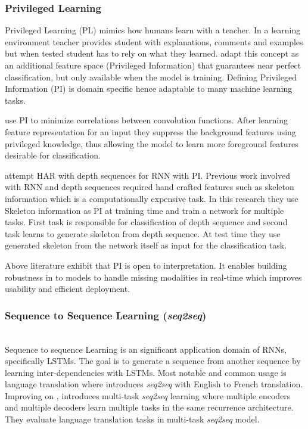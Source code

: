 \subsubsection{Privileged Learning}
Privileged Learning (PL) mimics how humans learn with a teacher. In a learning environment teacher provides student with explanations, comments and examples but when tested student has to rely on what they learned.  adapt this concept as an additional feature space (Privileged Information) that guarantees near perfect classification, but only available when the model is training. Defining Privileged Information (PI) is domain specific hence adaptable to many machine learning tasks.

 use PI to minimize correlations between convolution functions. After learning feature representation for an input they suppress the background features using privileged knowledge, thus allowing the model to learn more foreground features desirable for classification. 

 attempt HAR with depth sequences for RNN with PI. Previous work involved with RNN and depth sequences required hand crafted features such as skeleton information which is a computationally expensive task. In this research they use Skeleton information as PI at training time and train a network for multiple tasks. First task is responsible for classification of depth sequence and second task learns to generate skeleton from depth sequence. At test time they use generated skeleton from the network itself as input for the classification task. 

Above literature exhibit that PI is open to interpretation. It enables building robustness in to models to handle missing modalities in real-time which improves usability and efficient deployment. 

\subsubsection{Sequence to Sequence Learning (\textit{seq2seq})}\mbox{}\\
Sequence to sequence Learning is an significant application domain of RNNs, specifically LSTMs. The goal is to generate a sequence from another sequence by learning inter-dependencies with LSTMs. Most notable and common usage is language translation where  introduces \textit{seq2seq} with English to French translation. Improving on \cite{sutskever2014sequence},  introduces multi-task \textit{seq2seq} learning where multiple encoders and multiple decoders learn multiple tasks in the same recurrence architecture. They evaluate language translation tasks in multi-task \textit{seq2seq} model.

